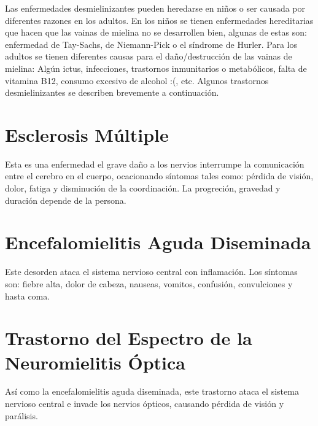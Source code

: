 \vspace{0.5cm}

Las enfermedades desmielinizantes pueden heredarse en niños o ser causada por diferentes razones en los adultos. En los niños se tienen enfermedades hereditarias que hacen que las vainas de mielina no se desarrollen bien, algunas de estas son: enfermedad de Tay-Sachs, de Niemann-Pick o el síndrome de Hurler. Para los adultos se tienen diferentes causas para el daño/destrucción de las vainas de mielina: Algún ictus, infecciones, trastornos inmunitarios o metabólicos, falta de vitamina B12, consumo excesivo de alcohol :(, etc. Algunos trastornos desmielinizantes se describen brevemente a continuación.

\section*{Esclerosis Múltiple}
Esta es una enfermedad el grave daño a los nervios interrumpe la comunicación entre el cerebro en el cuerpo, ocacionando síntomas tales como: pérdida de visión, dolor, fatiga y disminución de la coordinación. La progreción, gravedad y duración depende de la persona.

\section*{Encefalomielitis Aguda Diseminada}
Este desorden ataca el sistema nervioso central con inflamación. Los síntomas son: fiebre alta, dolor de cabeza, nauseas, vomitos, confusión, convulciones y hasta coma.


\section*{Trastorno del Espectro de la Neuromielitis Óptica}
Así como la encefalomielitis aguda diseminada, este trastorno ataca el sistema nervioso central e invade los nervios ópticos, causando pérdida de visión y parálisis.


